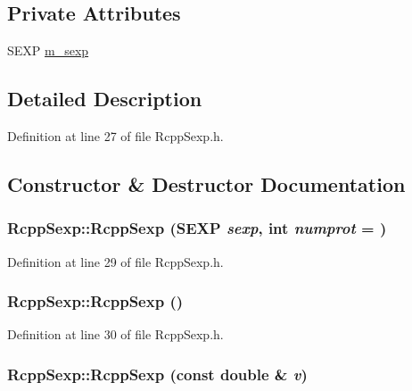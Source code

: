 \subsection*{Private Attributes}
\begin{DoxyCompactItemize}
\item 
SEXP \hyperlink{classRcppSexp_ae6b936d1ab1f79174904005a330fd904}{m\_\-sexp}
\end{DoxyCompactItemize}


\subsection{Detailed Description}


Definition at line 27 of file RcppSexp.h.

\subsection{Constructor \& Destructor Documentation}
\hypertarget{classRcppSexp_ac04b17cce83078dff3bfa9b200e9bbef}{
\subsubsection[{RcppSexp}]{\setlength{\rightskip}{0pt plus 5cm}RcppSexp::RcppSexp (SEXP {\em sexp}, \/  int {\em numprot} = {})}}
\label{classRcppSexp_ac04b17cce83078dff3bfa9b200e9bbef}


Definition at line 29 of file RcppSexp.h.\hypertarget{classRcppSexp_a78fc5fb126d388f9c4c3e9febcc95229}{
\subsubsection[{RcppSexp}]{\setlength{\rightskip}{0pt plus 5cm}RcppSexp::RcppSexp ()}}
\label{classRcppSexp_a78fc5fb126d388f9c4c3e9febcc95229}


Definition at line 30 of file RcppSexp.h.\hypertarget{classRcppSexp_acf6fc00ffd9616dea4926baf40e6f77d}{
\subsubsection[{RcppSexp}]{\setlength{\rightskip}{0pt plus 5cm}RcppSexp::RcppSexp (const double \& {\em v})}}
\label{classRcppSexp_acf6fc00ffd9616dea4926baf40e6f77d}


